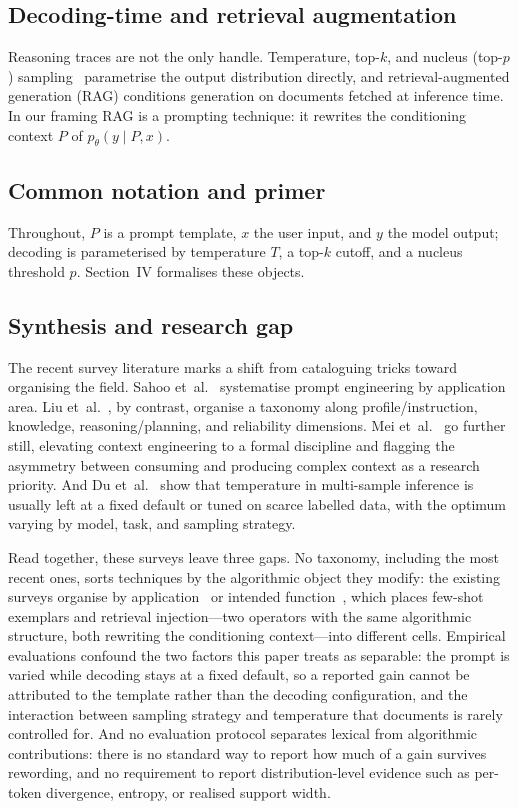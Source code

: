 \documentclass[conference]{IEEEtran}
\begin{document}
\subsection{Decoding-time and retrieval augmentation}

Reasoning traces are not the only handle.  Temperature, top-$k$, and
nucleus (top-$p$) sampling~\cite{b8} parametrise the output
distribution directly, and retrieval-augmented generation (RAG)
conditions generation on documents fetched at inference time.  In our
framing RAG is a prompting technique: it rewrites the conditioning
context $P$ of $p_\theta(y \mid P, x)$.

\subsection{Common notation and primer}
\label{sec:notation}

Throughout, $P$ is a prompt template, $x$ the user input, and $y$ the
model output; decoding is parameterised by temperature $T$, a top-$k$
cutoff, and a nucleus threshold $p$.  Section~IV formalises these
objects.

\subsection{Synthesis and research gap}

The recent survey literature marks a shift from cataloguing tricks
toward organising the field.  Sahoo et~al.~\cite{b23} systematise
prompt engineering by application area.  Liu et~al.~\cite{b24}, by
contrast, organise a taxonomy along profile/instruction, knowledge,
reasoning/planning, and reliability dimensions.  Mei et~al.~\cite{b25}
go further still, elevating context engineering to a formal discipline
and flagging the asymmetry between consuming and producing complex
context as a research priority.  And Du et~al.~\cite{b26} show that
temperature in multi-sample inference is usually left at a fixed
default or tuned on scarce labelled data, with the optimum varying by
model, task, and sampling strategy.

Read together, these surveys leave three gaps.  No taxonomy,
including the most recent ones, sorts techniques by the algorithmic
object they modify: the existing surveys organise by
application~\cite{b15,b23} or intended function~\cite{b16,b24}, which
places few-shot exemplars and retrieval injection---two operators with
the same algorithmic structure, both rewriting the conditioning
context---into different cells.  Empirical evaluations confound the
two factors this paper treats as separable: the prompt is varied
while decoding stays at a fixed default, so a reported gain cannot be
attributed to the template rather than the decoding configuration,
and the interaction between sampling strategy and temperature that
\cite{b26} documents is rarely controlled for.  And no evaluation
protocol separates lexical from algorithmic contributions: there is no
standard way to report how much of a gain survives rewording, and no
requirement to report distribution-level evidence such as per-token
divergence, entropy, or realised support width.
\end{document}
